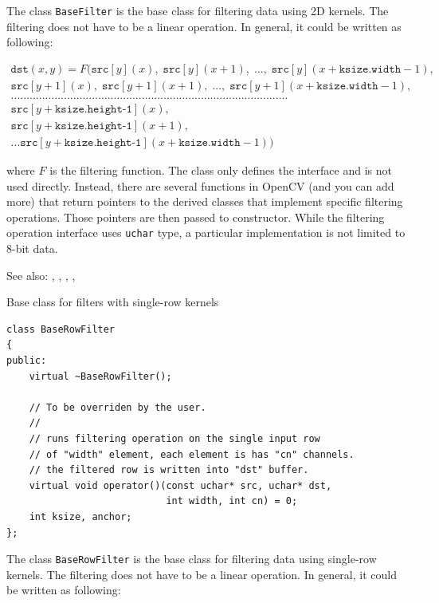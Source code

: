 The class \texttt{BaseFilter} is the base class for filtering data using 2D kernels. The filtering does not have to be a linear operation. In general, it could be written as following:

\[
  \begin{array}{l}
  \texttt{dst}(x,y) = F( \texttt{src}[y](x),\;\texttt{src}[y](x+1),\;...,\;\texttt{src}[y](x+\texttt{ksize.width}-1), \\
  \texttt{src}[y+1](x),\;\texttt{src}[y+1](x+1),\;...,\;\texttt{src}[y+1](x+\texttt{ksize.width}-1), \\
  ......................................................................................... \\
  \texttt{src}[y+\texttt{ksize.height-1}](x),\\
  \texttt{src}[y+\texttt{ksize.height-1}](x+1),\\
  ...
  \texttt{src}[y+\texttt{ksize.height-1}](x+\texttt{ksize.width}-1))
  \end{array}
  \]

where $F$ is the filtering function. The class only defines the interface and is not used directly. Instead, there are several functions in OpenCV (and you can add more) that return pointers to the derived classes that implement specific filtering operations. Those pointers are then passed to  constructor. While the filtering operation interface uses \texttt{uchar} type, a particular implementation is not limited to 8-bit data.

See also: , , ,
    , 

\label{BaseRowFilter}
Base class for filters with single-row kernels

\begin{lstlisting}
class BaseRowFilter
{
public:
    virtual ~BaseRowFilter();
    
    // To be overriden by the user.
    //
    // runs filtering operation on the single input row
    // of "width" element, each element is has "cn" channels.
    // the filtered row is written into "dst" buffer.
    virtual void operator()(const uchar* src, uchar* dst,
                            int width, int cn) = 0;
    int ksize, anchor;
};
\end{lstlisting}

The class \texttt{BaseRowFilter} is the base class for filtering data using single-row kernels. The filtering does not have to be a linear operation. In general, it could be written as following:

